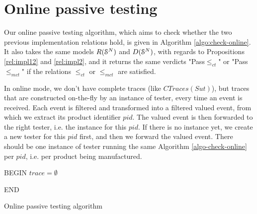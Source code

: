 \section{Online passive testing}
\label{sec:testing:online}

Our online passive testing algorithm, which aims to check whether
the two previous implementation relations hold, is given in
Algorithm \ref{algo:check-online}. It also takes the same models
$R(\EuScript{S}^{N})$ and $D(\EuScript{S}^{N})$, with regards to
Propositions \ref{rel:impl12} and \ref{rel:impl2}, and it returns
the same verdicts "Pass$\leq_{ct}$" or "Pass$\leq_{mct}$" if the
relations $\leq_{ct}$ or $\leq_{mct}$ are satisfied.

In online mode, we don't have complete traces (like
$CTraces({Sut})$), but traces that are constructed on-the-fly by
an instance of tester, every time an event is received. Each event
is filtered and transformed into a filtered valued event, from
which we extract its product identifier $pid$. The valued event
is then forwarded to the right tester, i.e. the instance for this
$pid$. If there is no instance yet, we create a new tester for
this $pid$ first, and then we forward the valued event. There
should be one instance of tester running the same Algorithm
\ref{algo-check-online} per $pid$, i.e. per product being
manufactured.



\begin{algorithm}[h]


    BEGIN\;
    $trace = \emptyset$\;


    END\;

    \caption{Online passive testing algorithm}
    \label{algo:check-online}
\end{algorithm}
